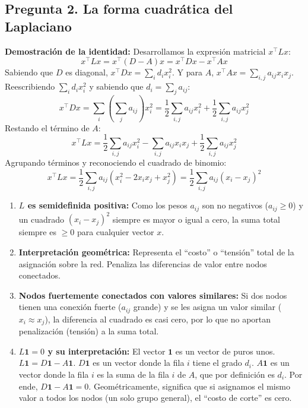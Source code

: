 \documentclass{article}
\begin{document}
	\subsection*{Pregunta 2. La forma cuadrática del Laplaciano}
	\textbf{Demostración de la identidad:} Desarrollamos la expresión matricial \(x^\top L x\):
	\[
	x^\top L x = x^\top (D - A) x = x^\top D x - x^\top A x
	\]
	Sabiendo que \(D\) es diagonal, \(x^\top D x = \sum_i d_i x_i^2\). Y para \(A\), \(x^\top A x = \sum_{i,j} a_{ij} x_i x_j\). Reescribiendo \(\sum_i d_i x_i^2\) y sabiendo que \(d_i = \sum_j a_{ij}\):
	\[
	x^\top D x = \sum_i \left( \sum_j a_{ij} \right) x_i^2 = \frac{1}{2} \sum_{i,j} a_{ij} x_i^2 + \frac{1}{2} \sum_{i,j} a_{ij} x_j^2
	\]
	Restando el término de \(A\):
	\[
	x^\top L x = \frac{1}{2} \sum_{i,j} a_{ij} x_i^2 - \sum_{i,j} a_{ij} x_i x_j + \frac{1}{2} \sum_{i,j} a_{ij} x_j^2
	\]
	Agrupando términos y reconociendo el cuadrado de binomio:
	\[
	x^\top L x = \frac{1}{2} \sum_{i,j} a_{ij} (x_i^2 - 2x_i x_j + x_j^2) = \frac{1}{2} \sum_{i,j} a_{ij} (x_i - x_j)^2
	\]
	
	\begin{enumerate}[label=\alph*)]
		\item \textbf{\(L\) es semidefinida positiva:} Como los pesos \(a_{ij}\) son no negativos (\(a_{ij} \ge 0\)) y un cuadrado \((x_i - x_j)^2\) siempre es mayor o igual a cero, la suma total siempre es \(\ge 0\) para cualquier vector \(x\).
		
		\item \textbf{Interpretación geométrica:} Representa el ``costo'' o ``tensión'' total de la asignación sobre la red. Penaliza las diferencias de valor entre nodos conectados.
		
		\item \textbf{Nodos fuertemente conectados con valores similares:} Si dos nodos tienen una conexión fuerte (\(a_{ij}\) grande) y se les asigna un valor similar (\(x_i \approx x_j\)), la diferencia al cuadrado es casi cero, por lo que no aportan penalización (tensión) a la suma total.
		
		\item \textbf{\(L\mathbf{1} = 0\) y su interpretación:} El vector \(\mathbf{1}\) es un vector de puros unos. \(L\mathbf{1} = D\mathbf{1} - A\mathbf{1}\). \(D\mathbf{1}\) es un vector donde la fila \(i\) tiene el grado \(d_i\). \(A\mathbf{1}\) es un vector donde la fila \(i\) es la suma de la fila \(i\) de \(A\), que por definición es \(d_i\). Por ende, \(D\mathbf{1} - A\mathbf{1} = 0\). Geométricamente, significa que si asignamos el mismo valor a todos los nodos (un solo grupo general), el ``costo de corte'' es cero.
	\end{enumerate}
	
\end{document}
